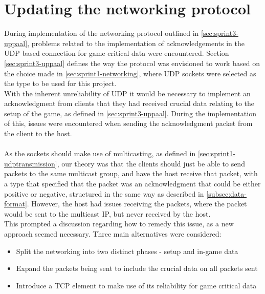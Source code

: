 \section{Updating the networking protocol}\label{sec:update-network-protocol}
During implementation of the networking protocol outlined in \autoref{sec:sprint3-uppaal}, problems related to the implementation of acknowledgements in the UDP based connection for game critical data were encountered.
Section \ref{sec:sprint3-uppaal} defines the way the protocol was envisioned to work based on the choice made in \autoref{sec:sprint1-networking}, where UDP sockets were selected as the type to be used for this project.
\\
With the inherent unreliability of UDP it would be necessary to implement an acknowledgment from clients that they had received crucial data relating to the setup of the game, as defined in \autoref{sec:sprint3-uppaal}.
During the implementation of this, issues were encountered when sending the acknowledgment packet from the client to the host.
\\\\
As the sockets should make use of multicasting, as defined in \autoref{sec:sprint1-udptransmission}, our theory was that the clients should just be able to send packets to the same multicast group, and have the host receive that packet, with a type that specified that the packet was an acknowledgment that could be either positive or negative, structured in the same way as described in \autoref{subsec:data-format}.
However, the host had issues receiving the packets, where the packet would be sent to the multicast IP, but never received by the host.
\\
This prompted a discussion regarding how to remedy this issue, as a new approach seemed necessary.
Three main alternatives were considered:
\begin{itemize}
    \item Split the networking into two distinct phases - setup and in-game data
    \item Expand the packets being sent to include the crucial data on all packets sent
    \item Introduce a TCP element to make use of its reliability for game critical data
\end{itemize}


